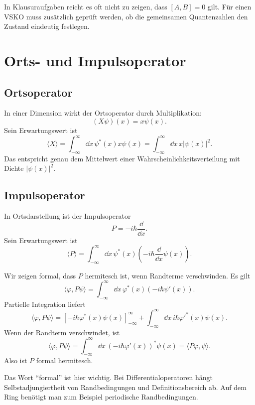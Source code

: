 \begin{examtipbox}
In Klausuraufgaben reicht es oft nicht zu zeigen, dass $[A,B]=0$ gilt. Für einen VSKO muss zusätzlich geprüft werden, ob die gemeinsamen Quantenzahlen den Zustand eindeutig festlegen.
\end{examtipbox}

\section{Orts- und Impulsoperator}

\subsection{Ortsoperator}

In einer Dimension wirkt der Ortsoperator durch Multiplikation:
\[
    (X\psi)(x)=x\psi(x).
\]
Sein Erwartungswert ist
\[
    \langle X\rangle
    =\int_{-\infty}^{\infty}\dd x\,\psi^*(x)x\psi(x)
    =\int_{-\infty}^{\infty}\dd x\,x|\psi(x)|^2.
\]
Das entspricht genau dem Mittelwert einer Wahrscheinlichkeitsverteilung mit Dichte $|\psi(x)|^2$.

\subsection{Impulsoperator}

In Ortsdarstellung ist der Impulsoperator
\[
    P=-i\hbar\frac{\dd}{\dd x}.
\]
Sein Erwartungswert ist
\[
    \langle P\rangle
    =\int_{-\infty}^{\infty}\dd x\,\psi^*(x)
    \left(-i\hbar\frac{\dd}{\dd x}\psi(x)\right).
\]

\begin{derivationbox}
Wir zeigen formal, dass $P$ hermitesch ist, wenn Randterme verschwinden. Es gilt
\[
    \langle \varphi,P\psi\rangle
    =\int_{-\infty}^{\infty}\dd x\,\varphi^*(x)\left(-i\hbar\psi'(x)\right).
\]
Partielle Integration liefert
\[
    \langle \varphi,P\psi\rangle
    =\left[-i\hbar\varphi^*(x)\psi(x)\right]_{-\infty}^{\infty}
    +\int_{-\infty}^{\infty}\dd x\,i\hbar\varphi'^*(x)\psi(x).
\]
Wenn der Randterm verschwindet, ist
\[
    \langle \varphi,P\psi\rangle
    =\int_{-\infty}^{\infty}\dd x\,\left(-i\hbar\varphi'(x)\right)^*\psi(x)
    =\langle P\varphi,\psi\rangle.
\]
Also ist $P$ formal hermitesch.
\end{derivationbox}

\begin{notebox}
Das Wort \enquote{formal} ist hier wichtig. Bei Differentialoperatoren hängt Selbstadjungiertheit von Randbedingungen und Definitionsbereich ab. Auf dem Ring benötigt man zum Beispiel periodische Randbedingungen.
\end{notebox}

